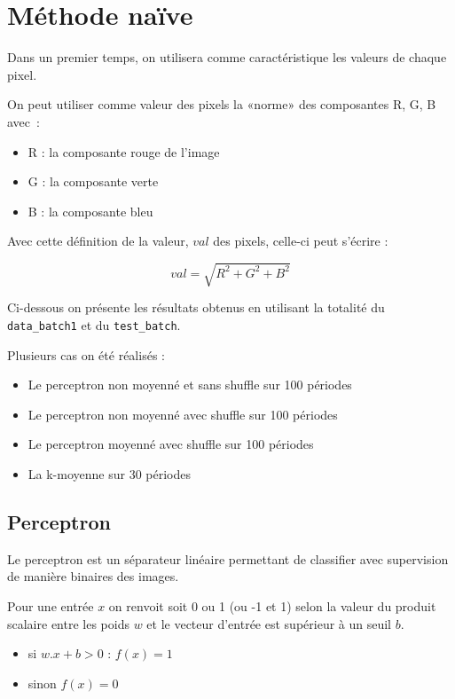 \chapter{Méthode naïve}

Dans un premier temps, on utilisera comme caractéristique les valeurs de chaque pixel.

On peut utiliser comme valeur des pixels la «norme» des composantes R, G, B
avec~:

\begin{itemize}
\item R : la composante rouge de l'image
\item G : la composante verte
\item B : la composante bleu
\end{itemize}

Avec cette définition de la valeur, $val$ des pixels, celle-ci peut s'écrire :

\begin{equation}
val = \sqrt{R^{2} + G^{2} + B^{2}}
\end{equation}

Ci-dessous on présente les résultats obtenus en utilisant la totalité du \verb|data_batch1| et du \verb|test_batch|.

Plusieurs cas on été réalisés :
\begin{itemize}
\item Le perceptron non moyenné et sans shuffle sur 100 périodes
\item Le perceptron non moyenné avec shuffle sur 100 périodes
\item Le perceptron moyenné avec shuffle sur 100 périodes
\item La k-moyenne sur 30 périodes
\end{itemize}

\section{Perceptron}

Le perceptron est un séparateur linéaire permettant de classifier avec supervision de manière binaires des images.

Pour une entrée $x$ on renvoit soit 0 ou 1 (ou -1 et 1) selon la valeur du produit scalaire entre les poids $w$ et le vecteur d'entrée  est supérieur à un seuil $b$.

\begin{itemize}
\item si $w.x + b > 0$ : $f(x) = 1$ 

\item sinon    $f(x) = 0$ 

\end{itemize}

